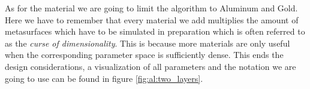 As for the material we are going to limit the algorithm to Aluminum and Gold. Here we have to remember that every material we add multiplies the amount of metasurfaces which have to be simulated in preparation which is often referred to as the \textit{curse of dimensionality}. This is because more materials are only useful when the corresponding parameter space is sufficiently dense. This ends the design considerations, a visualization of all parameters and the notation we are going to use can be found in figure \ref{fig:al:two_layers}.
